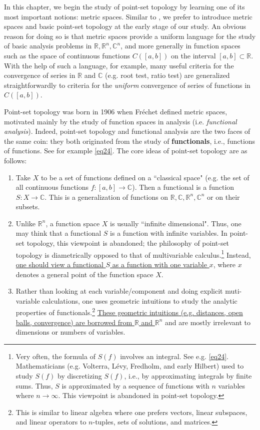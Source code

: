 \documentclass[12pt,b5paper,notitlepage]{article}
\theoremstyle{definition}
\theoremstyle{plain}
\newcommand{\Cbb}{\mathbb C}
\newcommand{\Rbb}{\mathbb R}
\numberwithin{equation}{section}
\begin{document}
In this chapter, we begin the study of point-set topology by learning one of its most important notions: metric spaces. Similar to \cite{Rud-P}, we prefer to introduce metric spaces and basic point-set topology at the early stage of our study. An obvious reason for doing so is that metric spaces provide a uniform language for the study of basic analysis problems in $\Rbb,\Rbb^n,\Cbb^n$, and more generally in function spaces such as the space of continuous functions $C([a,b])$ on the interval $[a,b]\subset\Rbb$. With the help of such a language, for example, many useful criteria for the convergence of series in $\Rbb$ and $\Cbb$ (e.g. root test, ratio test) are generalized straightforwardly to criteria for the \textit{uniform} convergence of series of functions in $C([a,b])$.

Point-set topology was born in 1906 when Fr\'echet defined metric spaces, motivated mainly by the study of function spaces in analysis (i.e. \textit{functional analysis}). Indeed, point-set topology and functional analysis are the two faces of the same coin: they both originated from the study of \textbf{functionals},  i.e., functions of functions. See for example \eqref{eq24}. The core ideas of point-set topology are as follows:
\begin{enumerate}[label=(\arabic*)]
\item Take $X$ to be a set of functions defined on a ``classical space" (e.g. the set of all continuous functions $f:[a,b]\rightarrow\Cbb$). Then a functional is a function  $S:X\rightarrow \Cbb$. This is a generalization of functions on $\Rbb,\Cbb,\Rbb^n,\Cbb^n$ or on their subsets.
\item Unlike $\Rbb^n$, a function space $X$ is usually ``infinite dimensional". Thus, one may think that a functional $S$ is a function with infinite variables. In point-set topology, this viewpoint is abandoned; the philosophy of point-set topology is diametrically opposed to that of multivariable calculus.\footnote{Very often, the formula of $S(f)$ involves an integral. See e.g. \eqref{eq24}. Mathematicians (e.g. Volterra, L\'evy, Fredholm, and early Hilbert) used to study $S(f)$ by discretizing $S(f)$, i.e., by approximating integrals by finite sums. Thus, $S$ is approximated by a sequence of functions with $n$ variables where $n\rightarrow\infty$. This viewpoint is abandoned in point-set topology.} Instead, \uline{one should view a functional $S$ as a function with one variable $x$}, where $x$ denotes a general point of the function space $X$.
\item Rather than looking at each variable/component and doing explicit muti-variable calculations, one uses geometric intuitions to study the analytic properties of functionals.\footnote{This is similar to linear algebra where one prefers vectors, linear subspaces, and linear operators to $n$-tuples, sets of solutions, and matrices.} \uline{These geometric intuitions (e.g. distances, open balls, convergence) are borrowed from  $\Rbb$ and $\Rbb^n$}  and are mostly irrelevant to dimensions or numbers of variables.
\end{enumerate}
\end{document}
